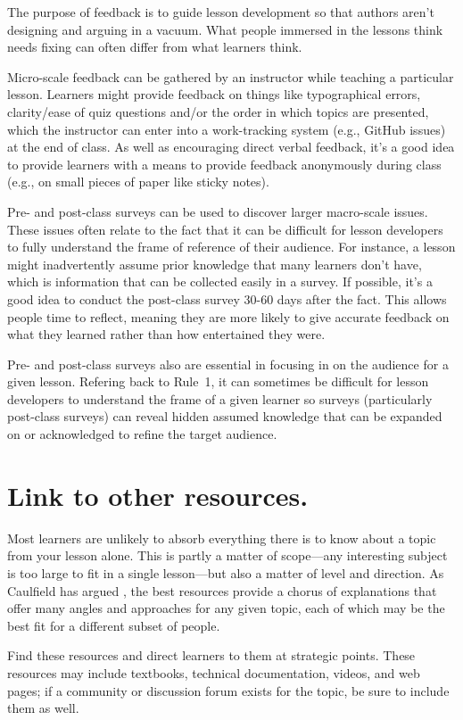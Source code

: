 \documentclass[10pt,letterpaper]{article}
\newcommand{\rulemajor}[1]{\section{#1}}
\begin{document}
The purpose of feedback is to guide lesson development
so that authors aren't designing and arguing in a vacuum.
What people immersed in the lessons think needs fixing
can often differ from what learners think.

Micro-scale feedback can be gathered by an instructor while teaching a particular lesson.
Learners might provide feedback on things like typographical errors,
clarity/ease of quiz questions and/or the order in which topics are presented,
which the instructor can enter into a work-tracking system (e.g., GitHub issues) at the end of class.
As well as encouraging direct verbal feedback,
it's a good idea to provide learners with a means to provide feedback anonymously during class
(e.g., on small pieces of paper like sticky notes).

Pre- and post-class surveys can be used to discover larger macro-scale issues.
These issues often relate to the fact that it can be difficult for lesson developers
to fully understand the frame of reference of their audience.
For instance, a lesson might inadvertently assume prior knowledge that many learners don't have,
which is information that can be collected easily in a survey.
If possible, it's a good idea to conduct the post-class survey 30-60 days after the fact.
This allows people time to reflect,
meaning they are more likely to give accurate feedback on what they learned
rather than how entertained they were.

Pre- and post-class surveys also are essential in focusing in on the audience for a given lesson.
Refering back to Rule~1,
it can sometimes be difficult for lesson developers to understand the frame of a given learner
so surveys (particularly post-class surveys) can reveal hidden assumed knowledge
that can be expanded on or acknowledged to refine the target audience.

\rulemajor{Link to other resources.}

Most learners are unlikely to absorb everything there is to know about a topic
from your lesson alone.
This is partly a matter of scope---any interesting subject is too large
to fit in a single lesson---but also a matter of level and direction.
As Caulfield has argued \cite{choral-explanations},
the best resources provide a chorus of explanations
that offer many angles and approaches for any given topic,
each of which may be the best fit for a different subset of people.

Find these resources and direct learners to them at strategic points.
These resources may include textbooks,
technical documentation,
videos,
and web pages;
if a community or discussion forum exists for the topic,
be sure to include them as well.
\end{document}
